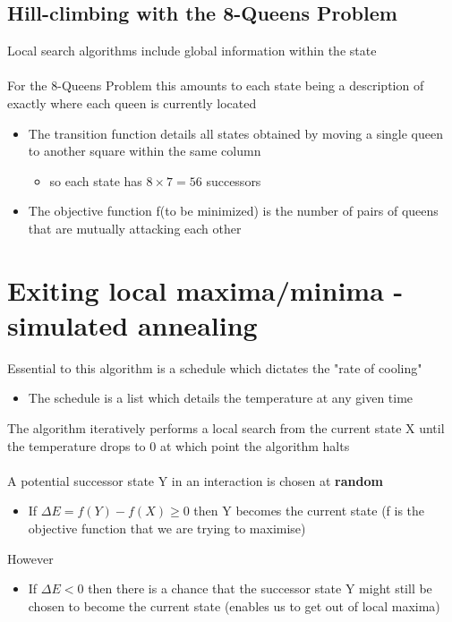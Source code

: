 \documentclass{article}[18pt]
\begin{document}
\subsection{Hill-climbing with the 8-Queens Problem}
Local search algorithms include global information within the state\\
\\
For the 8-Queens Problem this amounts to each state being a description of exactly where each queen is currently located
\begin{itemize}
	\item The transition function details all states obtained by moving a single queen to another square within the same column
	\begin{itemize}
		\item so each state has $8\times 7=56$ successors
	\end{itemize}
	\item The objective function f(to be minimized) is the number of pairs of queens that are mutually attacking each other
\end{itemize}
\section{Exiting local maxima/minima - simulated annealing}
Essential to this algorithm is a schedule which dictates the "rate of cooling"
\begin{itemize}
	\item The schedule is a list which details the temperature at any given time
\end{itemize}
The algorithm iteratively performs a local search from the current state X until the temperature drops to 0 at which point the algorithm halts\\
\\
A potential successor state Y in an interaction is chosen at \textbf{random}
\begin{itemize}
	\item If $\Delta E=f(Y)-f(X)\geqslant 0$ then Y becomes the current state (f is the objective function that we are trying to maximise)
\end{itemize}
However
\begin{itemize}
	\item If $\Delta E<0$ then there is a chance that the successor state Y might still be chosen to become the current state (enables us to get out of local maxima)
\end{itemize}
\end{document}
